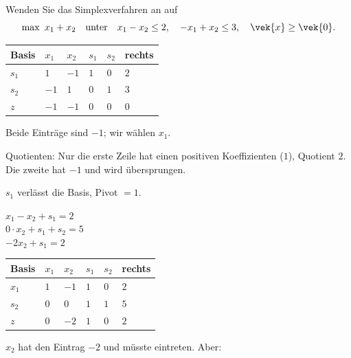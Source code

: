 \begin{aufgabe}
Wenden Sie das Simplexverfahren an auf
\[ \max\ x_1+x_2 \quad\text{unter}\quad x_1-x_2 \le 2,\quad -x_1+x_2 \le 3,\quad \vek{x}\ge\vek{0} . \]

\loesung
{}
\begin{center}
{\small
\renewcommand{\arraystretch}{1.48}
\begin{tabular}{@{}P{1.6cm}P{1.4cm}P{1.4cm}P{1.4cm}P{1.4cm}P{1.4cm}@{}}
\toprule
\textbf{Basis} & $x_1$ & $x_2$ & $s_1$ & $s_2$ & \textbf{rechts}\\
\midrule
$s_1$ & $1$ & $-1$ & $1$ & $0$ & $2$\\
$s_2$ & $-1$ & $1$ & $0$ & $1$ & $3$\\
\midrule
$z$ & $-1$ & $-1$ & $0$ & $0$ & $0$\\
\bottomrule
\end{tabular}}
\end{center}

Beide Einträge sind $-1$; wir wählen $x_1$.

Quotienten: Nur die erste Zeile hat einen positiven Koeffizienten ($1$), Quotient $2$. Die zweite hat $-1$ und wird übersprungen.

$s_1$ verlässt die Basis, Pivot $=1$.

 $x_1 - x_2 + s_1 = 2$\\
 $0\cdot x_2 + s_1 + s_2 = 5$\\
 $-2x_2 + s_1 = 2$

\begin{center}
{\small
\renewcommand{\arraystretch}{1.48}
\begin{tabular}{@{}P{1.6cm}P{1.4cm}P{1.4cm}P{1.4cm}P{1.4cm}P{1.4cm}@{}}
\toprule
\textbf{Basis} & $x_1$ & $x_2$ & $s_1$ & $s_2$ & \textbf{rechts}\\
\midrule
$x_1$ & $1$ & $-1$ & $1$ & $0$ & $2$\\
$s_2$ & $0$ & $0$ & $1$ & $1$ & $5$\\
\midrule
$z$ & $0$ & $-2$ & $1$ & $0$ & $2$\\
\bottomrule
\end{tabular}}
\end{center}

$x_2$ hat den Eintrag $-2$ und müsste eintreten. Aber:


\end{aufgabe}
